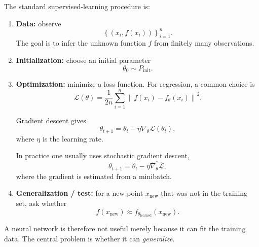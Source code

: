 The standard supervised-learning procedure is:

\begin{enumerate}
    \item \textbf{Data:}
    observe
    \begin{equation}
        \left\{
        (x_i,f(x_i))
        \right\}_{i=1}^n.
    \end{equation}
    The goal is to infer the unknown function $f$ from finitely many observations.

    \item \textbf{Initialization:}
    choose an initial parameter
    \begin{equation}
        \theta_0
        \sim
        P_{\mathrm{init}}.
    \end{equation}

    \item \textbf{Optimization:}
    minimize a loss function. For regression, a common choice is
    \begin{equation}
        \mathcal L(\theta)
        =
        \frac{1}{2n}
        \sum_{i=1}^n
        \left\|
        f(x_i)-f_\theta(x_i)
        \right\|^2.
    \end{equation}

    Gradient descent gives
    \begin{equation}
        \theta_{t+1}
        =
        \theta_t
        -
        \eta
        \nabla_\theta
        \mathcal L(\theta_t),
    \end{equation}
    where $\eta$ is the learning rate.

    In practice one usually uses stochastic gradient descent,
    \begin{equation}
        \theta_{t+1}
        =
        \theta_t
        -
        \eta
        \widehat{\nabla_\theta \mathcal L},
    \end{equation}
    where the gradient is estimated from a minibatch.

    \item \textbf{Generalization / test:}
    for a new point $x_{\mathrm{new}}$ that was not in the training set,
    ask whether
    \begin{equation}
        f(x_{\mathrm{new}})
        \approx
        f_{\theta_{\mathrm{learned}}}(x_{\mathrm{new}}).
    \end{equation}
\end{enumerate}

A neural network is therefore not useful merely because it can fit the training
data. The central problem is whether it can \emph{generalize}.


